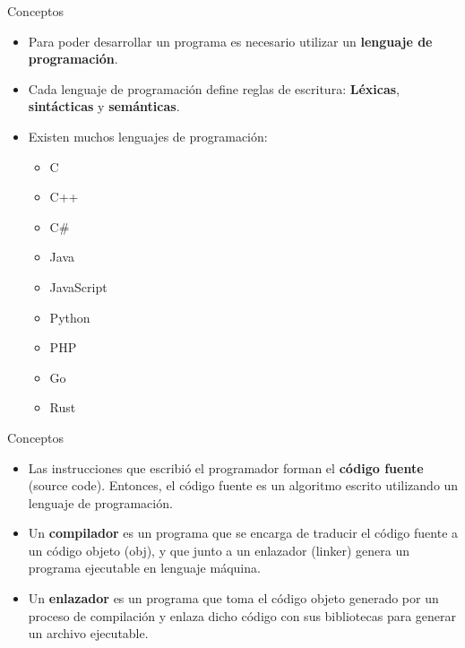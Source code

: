 \begin{frame}[c]{Conceptos}
  \begin{itemize}
    \item Para poder desarrollar un programa es necesario utilizar un
      \textbf{lenguaje de programación}.
    \pausa
    \item Cada lenguaje de programación define reglas de escritura:
      \textbf{Léxicas}, \textbf{sintácticas} y \textbf{semánticas}.
    \pausa
    \item Existen muchos lenguajes de programación:
      \begin{multicols}{3}
        \begin{itemize}
          \item C
          \pausa
          \item C++
          \pausa
          \item C\#
          \pausa
          \item Java
          \pausa
          \item JavaScript
          \pausa
          \item Python
          \pausa
          \item PHP
          \pausa
          \item Go
          \pausa
          \item Rust
        \end{itemize}
      \end{multicols}
  \end{itemize}
\end{frame}

\begin{frame}[c]{Conceptos}
  \begin{itemize}
    \item Las instrucciones que escribió el programador forman el
      \textbf{código fuente} (source code). Entonces, el código fuente es un
      algoritmo escrito utilizando un lenguaje de programación.
    \pausa
    \item Un \textbf{compilador} es un programa que se encarga de traducir
      el código fuente a un código objeto (obj), y que junto a un enlazador
      (linker) genera un programa ejecutable en lenguaje máquina.
    \pausa
    \item Un \textbf{enlazador} es un programa que toma el código objeto
      generado por un proceso de compilación y enlaza dicho código con sus
      bibliotecas para generar un archivo ejecutable.
  \end{itemize}
\end{frame}

